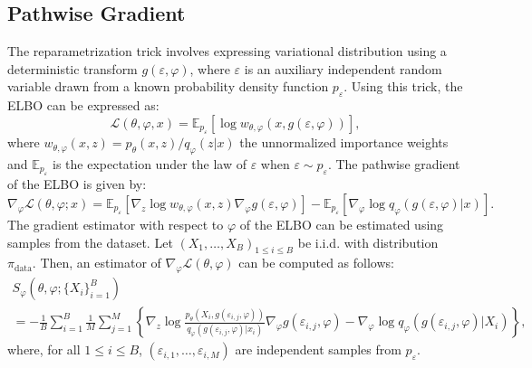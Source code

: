 \documentclass[english,graybox,envcountchap,envcountsame,sectrefs,shortlabels]{svmono}
\theoremstyle{style}
\newcommand{\eqsp}{}
\begin{document}
\subsection{Pathwise Gradient}
The reparametrization trick involves expressing variational distribution using a deterministic transform $ g(\varepsilon, \varphi)$, where $\varepsilon$ is an auxiliary independent random variable drawn from a known probability density function $p_\varepsilon$.
Using this trick, the ELBO can be expressed as:
$$ \mathcal{L}(\theta, \varphi, x) = \mathbb{E}_{p_\varepsilon}\left[ \log w_{\theta, \varphi}(x, g(\varepsilon,\varphi)) \right]\eqsp,$$
where $w_{\theta, \varphi}(x,z) = p_{\theta}(x, z)/q_{\varphi}(z|x)$ the unnormalized importance weights and $\mathbb{E}_{p_\varepsilon}$ is the expectation under the law of $\varepsilon$ when $\varepsilon \sim p_\varepsilon$. The pathwise gradient \cite{kingma2013auto, rezende2014stochastic} of the ELBO is given by:
\begin{equation*}
\nabla^{}_{\varphi} \mathcal{L}(\theta, \varphi; x) =  \mathbb{E}_{p_\varepsilon}\left[ \nabla_z \log w_{\theta, \varphi}(x,z) \nabla_{\varphi} g(\varepsilon, \varphi) \right]  - \mathbb{E}_{p_\varepsilon}\left[\nabla_{\varphi} \log q_{\varphi}(g(\varepsilon, \varphi) | x) \right]\eqsp.
\end{equation*}
The gradient estimator with respect to $\varphi$ of the ELBO can be estimated using samples from the dataset. Let  $(X_1,\ldots,X_B)_{1\leqslant i \leqslant B}$ be i.i.d. with distribution $\pi_{\mathrm{data}}$. Then, an estimator of $\nabla_{\varphi} \mathcal{L}(\theta, \varphi)$  can be computed as follows:
\begin{multline} \label{eq:grad_estimator_phi}
S_{\varphi}(\theta, \varphi; \{X_i\}_{i=1}^B) \\= -\frac{1}{B} \sum_{i=1}^{B} \frac{1}{M} \sum_{j=1}^{M} \left\{\nabla_z \log \frac{p_{\theta}(X_i, g(\varepsilon_{i,j}, \varphi))}{q_{\varphi}(g(\varepsilon_{i,j}, \varphi) | x_i)} \nabla_{\varphi} g(\varepsilon_{i,j}, \varphi) - \nabla_{\varphi} \log q_{\varphi}(g(\varepsilon_{i,j}, \varphi) | X_i)\right\}\eqsp,
\end{multline}
where, for all $1 \leq i \leq B$, $(\varepsilon_{i,1},\ldots,\varepsilon_{i,M})$ are independent samples from $p_{\varepsilon}$.
\end{document}
